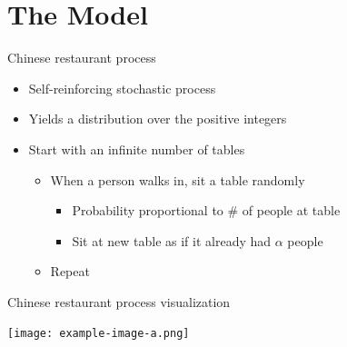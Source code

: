 \documentclass{beamer}
\newif\ifusevizzes
\begin{document}
\section{The Model}

\begin{frame}{Chinese restaurant process}
    \begin{itemize}
        \item Self-reinforcing stochastic process
        \item Yields a distribution over the positive integers
        \item Start with an infinite number of tables
            \begin{itemize}
                \item When a person walks in, sit a table randomly
                    \begin{itemize}
                        \item Probability proportional to \# of people at table
                        \item Sit at new table as if it already had $\alpha$ people
                    \end{itemize}
                \item Repeat
            \end{itemize}
    \end{itemize}
\end{frame}


\begin{frame}{Chinese restaurant process visualization}
    \begin{center}
        \ifusevizzes
            
        \else
            \texttt{[image: example-image-a.png]}
        \fi
    \end{center}
\end{frame}
\end{document}
